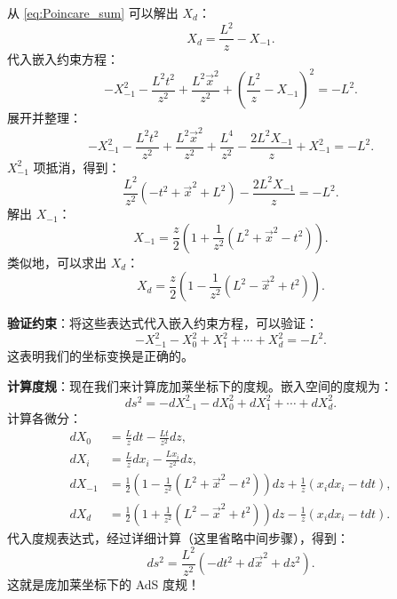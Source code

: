 从 \eqref{eq:Poincare_sum} 可以解出 $X_d$：
\begin{equation}
    X_d = \frac{L^2}{z} - X_{-1}.
\end{equation}
代入嵌入约束方程：
\begin{equation}
    -X_{-1}^2 - \frac{L^2 t^2}{z^2} + \frac{L^2 \vec{x}^2}{z^2} + \left(\frac{L^2}{z} - X_{-1}\right)^2 = -L^2.
\end{equation}
展开并整理：
\begin{equation}
    -X_{-1}^2 - \frac{L^2 t^2}{z^2} + \frac{L^2 \vec{x}^2}{z^2} + \frac{L^4}{z^2} - \frac{2L^2 X_{-1}}{z} + X_{-1}^2 = -L^2.
\end{equation}
$X_{-1}^2$ 项抵消，得到：
\begin{equation}
    \frac{L^2}{z^2}\left(-t^2 + \vec{x}^2 + L^2\right) - \frac{2L^2 X_{-1}}{z} = -L^2.
\end{equation}
解出 $X_{-1}$：
\begin{equation}
    X_{-1} = \frac{z}{2}\left(1 + \frac{1}{z^2}(L^2 + \vec{x}^2 - t^2)\right).
\end{equation}
类似地，可以求出 $X_d$：
\begin{equation}
    X_d = \frac{z}{2}\left(1 - \frac{1}{z^2}(L^2 - \vec{x}^2 + t^2)\right).
\end{equation}

\textbf{验证约束}：将这些表达式代入嵌入约束方程，可以验证：
\begin{equation}
    -X_{-1}^2 - X_0^2 + X_1^2 + \cdots + X_d^2 = -L^2.
\end{equation}
这表明我们的坐标变换是正确的。

\textbf{计算度规}：现在我们来计算庞加莱坐标下的度规。嵌入空间的度规为：
\begin{equation}
    ds^2 = -dX_{-1}^2 - dX_0^2 + dX_1^2 + \cdots + dX_d^2.
\end{equation}
计算各微分：
\begin{align}
    dX_0 &= \frac{L}{z} dt - \frac{L t}{z^2} dz, \\
    dX_i &= \frac{L}{z} dx_i - \frac{L x_i}{z^2} dz, \\
    dX_{-1} &= \frac{1}{2}\left(1 - \frac{1}{z^2}(L^2 + \vec{x}^2 - t^2)\right) dz + \frac{1}{z}(x_i dx_i - t dt), \\
    dX_d &= \frac{1}{2}\left(1 + \frac{1}{z^2}(L^2 - \vec{x}^2 + t^2)\right) dz - \frac{1}{z}(x_i dx_i - t dt).
\end{align}
代入度规表达式，经过详细计算（这里省略中间步骤），得到：
\begin{equation}
    ds^2 = \frac{L^2}{z^2}\left(-dt^2 + d\vec{x}^2 + dz^2\right).
\end{equation}
这就是庞加莱坐标下的 AdS 度规！

